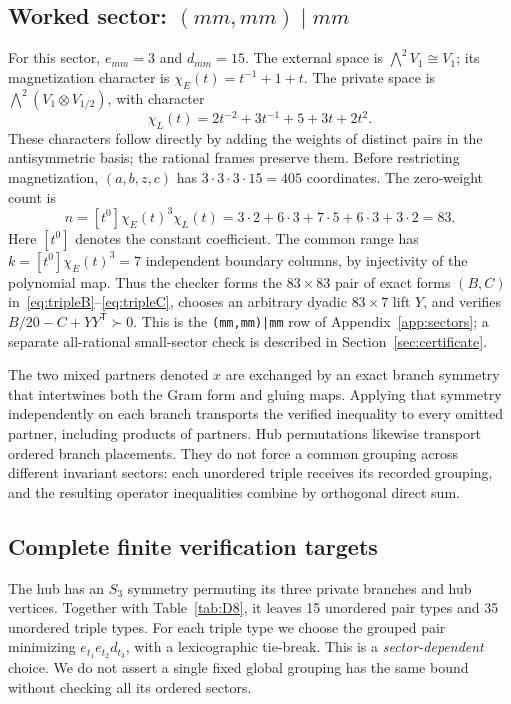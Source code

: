 \documentclass[11pt,a4paper]{article}
\theoremstyle{remark}\newtheorem{remark}[theorem]{Remark}
\begin{document}
\subsection{Worked sector: $(mm,mm)\mid mm$}
For this sector, $e_{mm}=3$ and $d_{mm}=15$. The external space is $\bigwedge^2 V_1\cong V_1$; its magnetization character is $\chi_E(t)=t^{-1}+1+t$. The private space is $\bigwedge^2(V_1\otimes V_{1/2})$, with character
\[
 \chi_L(t)=2t^{-2}+3t^{-1}+5+3t+2t^2.
\]
These characters follow directly by adding the weights of distinct pairs in the antisymmetric basis; the rational frames preserve them. Before restricting magnetization, $(a,b,z,c)$ has $3\cdot3\cdot3\cdot15=405$ coordinates. The zero-weight count is
\[
 n=[t^0]\chi_E(t)^3\chi_L(t)
 =3\cdot2+6\cdot3+7\cdot5+6\cdot3+3\cdot2=83.
\]
Here $[t^0]$ denotes the constant coefficient. The common range has
$k=[t^0]\chi_E(t)^3=7$ independent boundary columns, by injectivity of the polynomial map. Thus the checker forms the $83\times83$ pair of exact forms $(B,C)$ in~\eqref{eq:tripleB}--\eqref{eq:tripleC}, chooses an arbitrary dyadic $83\times7$ lift $Y$, and verifies $B/20-C+YY^{\mathsf T}\succ0$. This is the \texttt{(mm,mm)|mm} row of Appendix~\ref{app:sectors}; a separate all-rational small-sector check is described in Section~\ref{sec:certificate}.

The two mixed partners denoted $x$ are exchanged by an exact branch symmetry that intertwines both the Gram form and gluing maps. Applying that symmetry independently on each branch transports the verified inequality to every omitted partner, including products of partners. Hub permutations likewise transport ordered branch placements. They do not force a common grouping across different invariant sectors: each unordered triple receives its recorded grouping, and the resulting operator inequalities combine by orthogonal direct sum.

\subsection{Complete finite verification targets}
The hub has an $S_3$ symmetry permuting its three private branches and hub vertices. Together with Table~\ref{tab:D8}, it leaves 15 unordered pair types and 35 unordered triple types. For each triple type we choose the grouped pair minimizing $e_{t_1}e_{t_2}d_{t_3}$, with a lexicographic tie-break. This is a \emph{sector-dependent} choice. We do not assert a single fixed global grouping has the same bound without checking all its ordered sectors.
\end{document}
